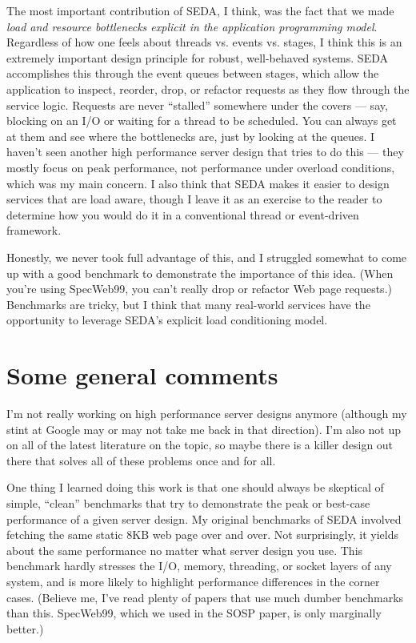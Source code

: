 \documentclass[a4paper,12pt,notitlepage,twoside,openright]{article}
\begin{document}
The most important contribution of SEDA, I think, was the fact that we made \emph{load and resource bottlenecks explicit in the application programming model}. Regardless of how one feels about threads vs. events vs. stages, I think this is an extremely important design principle for robust, well-behaved systems. SEDA accomplishes this through the event queues between stages, which allow the application to inspect, reorder, drop, or refactor requests as they flow through the service logic. Requests are never ``stalled'' somewhere under the covers --- say, blocking on an I/O or waiting for a thread to be scheduled. You can always get at them and see where the bottlenecks are, just by looking at the queues. I haven't seen another high performance server design that tries to do this --- they mostly focus on peak performance, not performance under overload conditions, which was my main concern. I also think that SEDA makes it easier to design services that are load aware, though I leave it as an exercise to the reader to determine how you would do it in a conventional thread or event-driven framework.

Honestly, we never took full advantage of this, and I struggled somewhat to come up with a good benchmark to demonstrate the importance of this idea. (When you're using SpecWeb99, you can't really drop or refactor Web page requests.) Benchmarks are tricky, but I think that many real-world services have the opportunity to leverage SEDA's explicit load conditioning model.

\section{Some general comments}

I'm not really working on high performance server designs anymore (although my stint at Google may or may not take me back in that direction). I'm also not up on all of the latest literature on the topic, so maybe there is a killer design out there that solves all of these problems once and for all.

One thing I learned doing this work is that one should always be skeptical of simple, ``clean'' benchmarks that try to demonstrate the peak or best-case performance of a given server design. My original benchmarks of SEDA involved fetching the same static 8KB web page over and over. Not surprisingly, it yields about the same performance no matter what server design you use. This benchmark hardly stresses the I/O, memory, threading, or socket layers of any system, and is more likely to highlight performance differences in the corner cases. (Believe me, I've read plenty of papers that use much dumber benchmarks than this. SpecWeb99, which we used in the SOSP paper, is only marginally better.)
\end{document}

